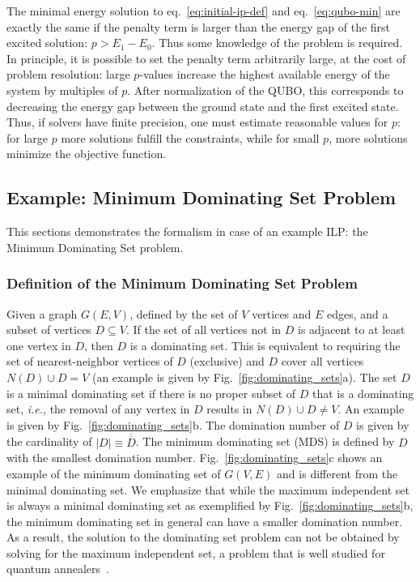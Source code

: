 \documentclass[prd,twocolumn,tightenlines,preprintnumbers,showpacs,superscriptaddress,notitlepage,nofootinbib,eqsecnum,floatfix,longbibliography]{revtex4}
\begin{document}
The minimal energy solution to eq.~\eqref{eq:initial-ip-def} and eq.~\eqref{eq:qubo-min} are exactly the same if the penalty term is larger than the energy gap of the first excited solution: $p > E_1 - E_0$.
Thus some knowledge of the problem is required.
In principle, it is possible to set the penalty term arbitrarily large, at the cost of problem resolution: large $p$-values increase the highest available energy of the system by multiples of $p$.
After normalization of the QUBO, this corresponds to decreasing the energy gap between the ground state and the first excited state.
Thus, if solvers have finite precision, one must estimate reasonable values for $p$: for large $p$ more solutions fulfill the constraints, while for small $p$, more solutions minimize the objective function.


\subsection{Example: Minimum Dominating Set Problem}
\label{sec:methods:mds}

This sections demonstrates the formalism in case of an example ILP: the Minimum Dominating Set problem.

\subsubsection{Definition of the Minimum Dominating Set Problem}
\label{sec:methods:mds-def}

Given a graph $G(E,V)$, defined by the set of $V$ vertices and $E$ edges, and a subset of vertices $D \subseteq V$.
If the set of all vertices not in $D$ is adjacent to at least one vertex in $D$, then $D$ is a dominating set.
This is equivalent to requiring the set of nearest-neighbor vertices of $D$ (exclusive) and $D$ cover all vertices $N(D) \cup D = V$ (an example is given by Fig.~\ref{fig:dominating_sets}a).
The set $D$ is a minimal dominating set if there is no proper subset of $D$ that is a dominating set, {\it{i.e.}}, the removal of any vertex in $D$ results in $N(D) \cup D  \neq V$.
An example is given by Fig.~\ref{fig:dominating_sets}b.
The domination number of $D$ is given by the cardinality of $|D| \equiv \overline{\overline{D}}$.
The minimum dominating set (MDS) is defined by $D$ with the smallest domination number.
Fig.~\ref{fig:dominating_sets}c shows an example of the minimum dominating set of $G(V, E)$ and is different from the minimal dominating set.
We emphasize that while the maximum independent set is always a minimal dominating set as exemplified by Fig.~\ref{fig:dominating_sets}b, the minimum dominating set in general can have a smaller domination number.
As a result, the solution to the dominating set problem can not be obtained by solving for the maximum independent set, a problem that is well studied for quantum annealers~\cite{}.
\end{document}
